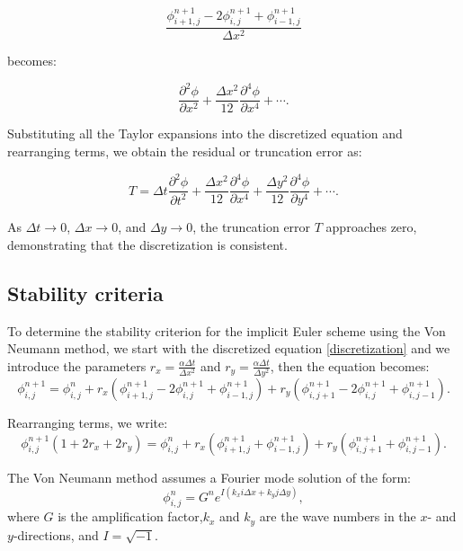 \documentclass{article}
\begin{document}
\begin{equation*}
\frac{\phi_{i+1, j}^{n+1} - 2\phi_{i,j}^{n+1} + \phi_{i-1,j}^{n+1}}{\Delta x^2}
\end{equation*}

becomes:

\begin{equation*}
\frac{\partial^2 \phi}{\partial x^2} + \frac{\Delta x^2}{12} \frac{\partial^4 \phi}{\partial x^4} + \cdots.
\end{equation*}

Substituting all the Taylor expansions into the discretized equation and rearranging terms, we obtain the residual or truncation error as:

\begin{equation}
T = \Delta t \frac{\partial^2 \phi}{\partial t^2} + \frac{\Delta x^2}{12} \frac{\partial^4 \phi}{\partial x^4} + \frac{\Delta y^2}{12} \frac{\partial^4 \phi}{\partial y^4} + \cdots.
\end{equation}

As \( \Delta t \to 0 \), \( \Delta x \to 0 \), and \( \Delta y \to 0 \), the truncation error \( T \) approaches zero, demonstrating that the discretization is consistent.


\subsection{Stability criteria}

To determine the stability criterion for the implicit Euler scheme using the Von Neumann method, we start with the discretized equation \eqref{discretization} and we
introduce the parameters $ r_x = \frac{\alpha \Delta t}{\Delta x^2} $ and $ r_y = \frac{\alpha \Delta t}{\Delta y^2} $, then the equation becomes:
\begin{equation*}
\phi_{i,j}^{n+1} = \phi_{i,j}^n + r_x \left( \phi_{i+1,j}^{n+1} - 2\phi_{i,j}^{n+1} + \phi_{i-1,j}^{n+1} \right) + r_y \left( \phi_{i,j+1}^{n+1} - 2\phi_{i,j}^{n+1} + \phi_{i,j-1}^{n+1} \right).
\end{equation*}

Rearranging terms, we write:
\begin{equation*}
\phi_{i,j}^{n+1} \left( 1 + 2r_x + 2r_y \right) = \phi_{i,j}^n + r_x \left( \phi_{i+1,j}^{n+1} + \phi_{i-1,j}^{n+1} \right) + r_y \left( \phi_{i,j+1}^{n+1} + \phi_{i,j-1}^{n+1} \right).
\end{equation*}

The Von Neumann method assumes a Fourier mode solution of the form:
\begin{equation*}
\phi_{i,j}^n = G^n e^{I(k_x i \Delta x + k_y j \Delta y)},
\end{equation*}
where $ G $ is the amplification factor,$ k_x $ and $ k_y $ are the wave numbers in the $ x $- and $ y $-directions, and $ I = \sqrt{-1} $.
\end{document}
